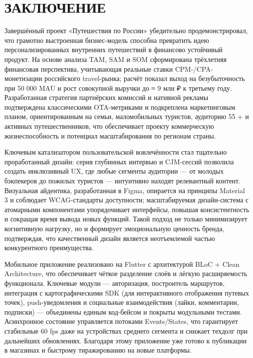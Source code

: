 \section{ЗАКЛЮЧЕНИЕ}
Завершённый проект «Путешествия по России» убедительно продемонстрировал, что грамотно выстроенная бизнес-модель способна превратить идею персонализированных внутренних путешествий в финансово устойчивый продукт. На основе анализа TAM, SAM и SOM сформирована трёхлетняя финансовая перспектива, учитывающая реальные ставки CPM-/CPA-монетизации российского travel-рынка; расчёт показал выход на безубыточность при 50 000 MAU и рост совокупной выручки до ≈ 9 млн ₽ к третьему году. Разработанная стратегия партнёрских комиссий и нативной рекламы подтверждена классическими OTA-метриками и подкреплена маркетинговым планом, ориентированным на семьи, маломобильных туристов, аудиторию 55 + и активных путешественников, что обеспечивает проекту коммерческую жизнеспособность и потенциал масштабирования по регионам страны.

Ключевым катализатором пользовательской вовлечённости стал тщательно проработанный дизайн: серия глубинных интервью и CJM-сессий позволила создать инклюзивный UX, где любые сегменты аудитории — от молодых бэкпекеров до пожилых туристов — интуитивно находят релевантный контент. Визуальная айдентика, разработанная в Figma, опирается на принципы Material 3 и соблюдает WCAG-стандарты доступности; масштабируемая дизайн-система с атомарными компонентами упорядочивает интерфейсы, повышая консистентность и сокращая время вывода новых функций. Такой подход не только минимизирует когнитивную нагрузку, но и формирует эмоциональную ценность бренда, подтверждая, что качественный дизайн является неотъемлемой частью конкурентного преимущества.

Мобильное приложение реализовано на Flutter с архитектурой BLoC + Clean Architecture, что обеспечивает чёткое разделение слоёв и лёгкую расширяемость функционала. Ключевые модули — авторизация, построитель маршрутов, интеграция с картографическими SDK (для интерактивного отображения путевых точек), push-уведомления и социальные взаимодействия (лайки, комментарии, подписки) — объединены единым код-бейсом и покрыты модульными тестами. Асинхронное состояние управляется потоками Events/States, что гарантирует стабильные 60 fps даже на устройствах среднего сегмента и снижает техдолг при дальнейших обновлениях. Благодаря этому приложение уже готово к публикации в магазинах и быстрому тиражированию на новые платформы.

